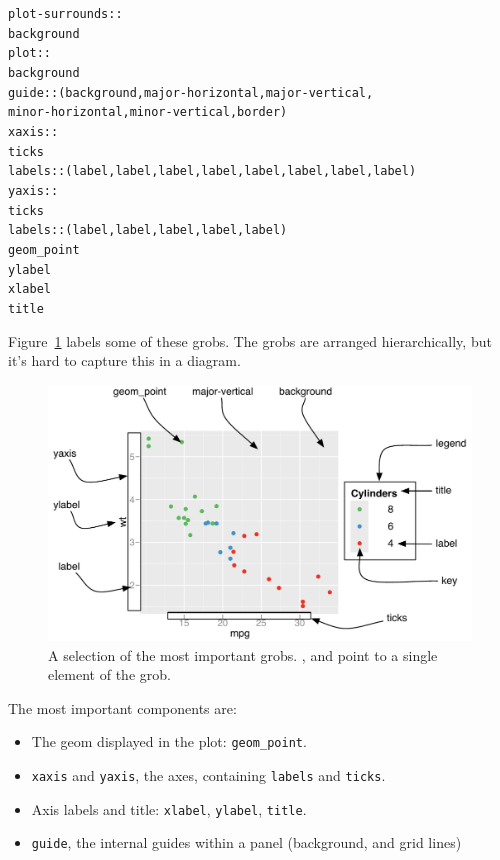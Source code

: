 \begin{alltt}
plot-surrounds::
 background
 plot::
  background
  guide:: (background, major-horizontal, major-vertical, 
           minor-horizontal, minor-vertical, border)
  xaxis::
   ticks
   labels:: (label, label, label, label, label, label, label, label)
  yaxis::
   ticks
   labels:: (label, label, label, label, label)
  geom_point
 ylabel
 xlabel
 title
\end{alltt}

Figure~\ref{fig:grobs} labels some of these grobs.  The grobs are arranged hierarchically, but it's hard to capture this in a diagram.

\begin{figure}[htbp]
  \centering
    \includegraphics[width=\textwidth]{grid-grobs}
  \caption{A selection of the most important grobs.  ,  and  point to a single element of the grob.}
  \label{fig:grobs}
\end{figure}

The most important components are:

\begin{itemize}
  \item The geom displayed in the plot: {\tt geom\_point}.

  \item {\tt xaxis} and {\tt yaxis}, the axes, containing {\tt labels} and {\tt ticks}.

  \item Axis labels and title: {\tt xlabel}, {\tt ylabel}, {\tt title}.

  \item {\tt guide}, the internal guides within a panel (background, and grid lines)

\end{itemize}


